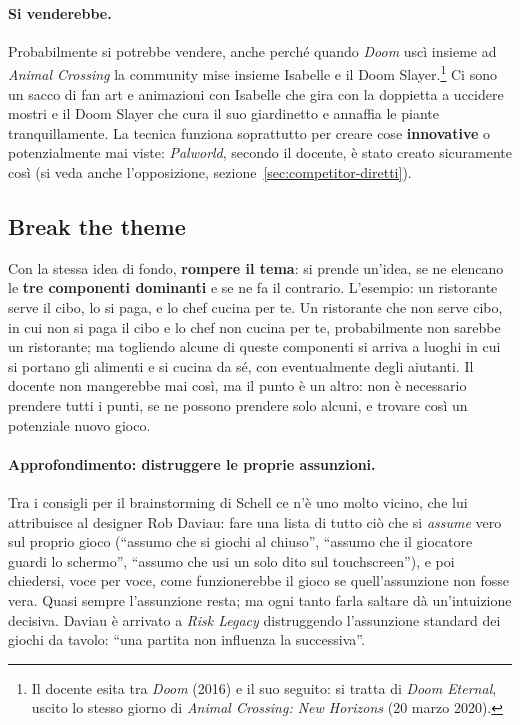 \paragraph{Si venderebbe.} Probabilmente si potrebbe vendere, anche perché
quando \emph{Doom} uscì insieme ad \emph{Animal Crossing} la community mise
insieme Isabelle e il Doom Slayer.\footnote{Il docente esita tra \emph{Doom}
(2016) e il suo seguito: si tratta di \emph{Doom Eternal}, uscito lo stesso
giorno di \emph{Animal Crossing: New Horizons} (20 marzo 2020).} Ci sono un
sacco di fan art e animazioni con Isabelle che gira con la doppietta a
uccidere mostri e il Doom Slayer che cura il suo giardinetto e annaffia le
piante tranquillamente. La tecnica funziona soprattutto per creare cose
\textbf{innovative} o potenzialmente mai viste: \emph{Palworld}, secondo il
docente, è stato creato sicuramente così (si veda anche l'opposizione,
sezione~\ref{sec:competitor-diretti}).

\subsection{Break the theme}

Con la stessa idea di fondo, \textbf{rompere il tema}: si prende un'idea, se ne
elencano le \textbf{tre componenti dominanti} e se ne fa il contrario.
L'esempio: un ristorante serve il cibo, lo si paga, e lo chef cucina per te.
Un ristorante che non serve cibo, in cui non si paga il cibo e lo chef non
cucina per te, probabilmente non sarebbe un ristorante; ma togliendo alcune di
queste componenti si arriva a luoghi in cui si portano gli alimenti e si
cucina da sé, con eventualmente degli aiutanti. Il docente non mangerebbe mai
così, ma il punto è un altro: non è necessario prendere tutti i punti, se ne
possono prendere solo alcuni, e trovare così un potenziale nuovo gioco.

\paragraph{Approfondimento: distruggere le proprie assunzioni.} Tra i consigli
per il brainstorming di Schell ce n'è uno molto vicino, che lui attribuisce
al designer Rob Daviau: fare una lista di tutto ciò che si \emph{assume} vero
sul proprio gioco (``assumo che si giochi al chiuso'', ``assumo che il
giocatore guardi lo schermo'', ``assumo che usi un solo dito sul
touchscreen''), e poi chiedersi, voce per voce, come funzionerebbe il gioco se
quell'assunzione non fosse vera. Quasi sempre l'assunzione resta; ma ogni
tanto farla saltare dà un'intuizione decisiva. Daviau è arrivato a \emph{Risk
Legacy} distruggendo l'assunzione standard dei giochi da tavolo: ``una partita
non influenza la successiva''.

